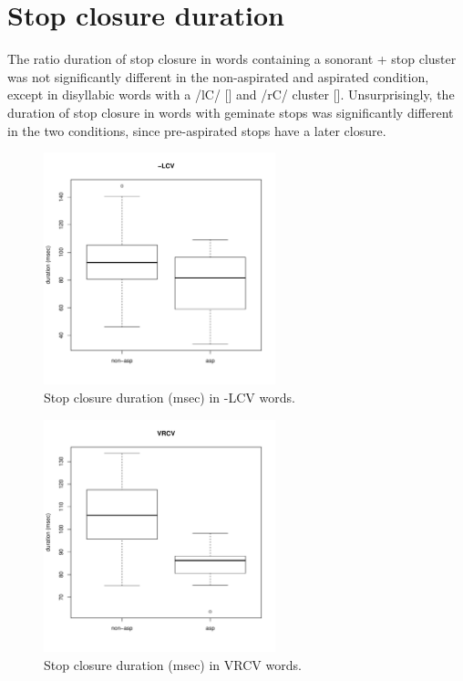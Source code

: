 \documentclass[11pt,a4paper,openany]{memoir}\usepackage[]{graphicx}\usepackage[]{color}
\newenvironment{knitrout}{}{} %
\begin{document}
\section{Stop closure duration}


The ratio duration of stop closure in words containing a sonorant + stop cluster was not significantly different in the non-aspirated and aspirated condition, except in disyllabic words with a /lC/ [] and /rC/ cluster [].
Unsurprisingly, the duration of stop closure in words with geminate stops was significantly different in the two conditions, since pre-aspirated stops have a later closure.

\begin{figure}
\centering
\begin{knitrout}
\color{fgcolor}
\includegraphics[width=0.6\textwidth]{img/di-lat-clos-box-1} 

\end{knitrout}
\caption{Stop closure duration (msec) in -LCV words.}
\label{f:dilatclos}
\end{figure}

\begin{figure}
\centering
\begin{knitrout}
\color{fgcolor}
\includegraphics[width=0.6\textwidth]{img/di-rho-clos-box-1} 

\end{knitrout}
\caption{Stop closure duration (msec) in VRCV words.}
\label{f:dirhoclos}
\end{figure}
\end{document}
